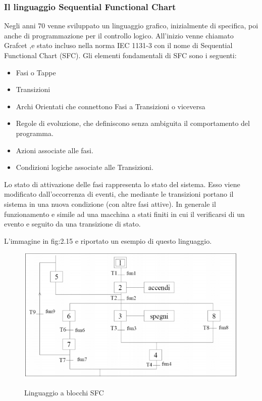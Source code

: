\documentclass[12pt, a4paper, oneside]{book}
\begin{document}
\subsubsection{Il linguaggio Sequential Functional Chart}
Negli anni 70 venne sviluppato un linguaggio grafico, inizialmente di specifica, poi anche di programmazione per il controllo logico. All’inizio venne chiamato Grafcet ,e stato incluso nella norma IEC 1131-3 con il nome di Sequential Functional Chart (SFC). 
Gli elementi fondamentali di SFC sono i seguenti:
\begin{itemize}
	\item Fasi o Tappe
	\item Transizioni
	\item Archi Orientati che connettono Fasi a Transizioni o viceversa
	\item Regole di evoluzione, che definiscono senza ambiguita il comportamento del programma.
	\item Azioni associate alle fasi.
	\item Condizioni logiche associate alle Transizioni.
\end{itemize}

Lo stato di attivazione delle fasi rappresenta lo stato del sistema. Esso viene modificato dall’occorrenza di eventi, che mediante le transizioni portano il sistema in una nuova condizione (con altre fasi attive). In generale il funzionamento e simile ad una macchina a stati finiti in cui il verificarsi di un evento e seguito da una transizione di stato.

L’immagine in fig:2.15 e riportato un esempio di questo linguaggio.

	\begin{figure}[H]
	\centering
	\includegraphics[width=12cm]{Immagini/BLK}
	\label{BLK}
	\caption{Linguaggio a blocchi SFC}
\end{figure}
\end{document}
